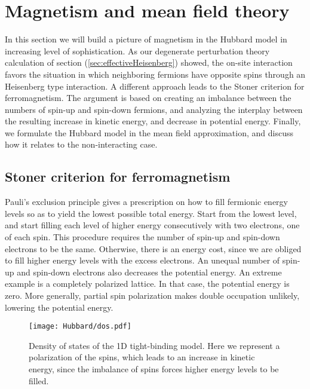 \section{Magnetism and mean field theory}\label{sec:magMFT}

In this section we will build a picture of magnetism in the Hubbard model in increasing level of sophistication.
As our degenerate perturbation theory  calculation of section (\ref{sec:effectiveHeisenberg}) showed, the on-site interaction favors the situation in which neighboring fermions have opposite spins through an Heisenberg type interaction.
A different approach leads to the Stoner criterion for ferromagnetism.
The argument is based on creating an imbalance between the numbers of spin-up and spin-down fermions, and analyzing the interplay between the resulting increase in kinetic energy, and decrease in potential energy.
Finally, we formulate the Hubbard model in the mean field approximation, and discuss how it relates to the non-interacting case.

\subsection{Stoner criterion for ferromagnetism}
\label{subsec:stoner}

Pauli's exclusion principle gives a prescription on how to fill fermionic energy levels so as to yield the lowest possible total energy.
Start from the lowest level, and start filling each level of higher energy consecutively with two electrons, one of each spin.
This procedure requires the number of spin-up and spin-down electrons to be the same.
Otherwise, there is an energy cost, since we are obliged to fill higher energy levels with the excess electrons.
An unequal number of spin-up and spin-down electrons also decreases the potential energy.
An extreme example is a completely polarized lattice.
In that case, the potential energy is zero.
More generally, partial spin polarization makes double occupation unlikely, lowering the potential energy.

\begin{figure}[H]
	\centering
\hspace{2mm}\texttt{[image: Hubbard/dos.pdf]}
	\caption[Density of states of the \acs{1D} tight-binding model.]{Density of states of the \acs{1D} tight-binding model.
	Here we represent a polarization of the spins, which leads to an increase in kinetic energy, since the imbalance of spins forces higher energy levels to be filled.}
	\label{fig:dos}
\end{figure}

